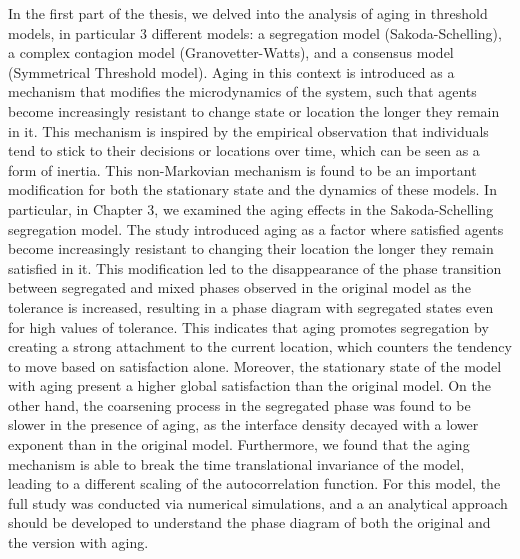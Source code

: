In the first part of the thesis, we delved into the analysis of aging in threshold models, in particular 3 different models: a segregation model (Sakoda-Schelling), a complex contagion model (Granovetter-Watts), and a consensus model (Symmetrical Threshold model). Aging in this context is introduced as a mechanism that modifies the microdynamics of the system, such that agents become increasingly resistant to change state or location the longer they remain in it. This mechanism is inspired by the empirical observation that individuals tend to stick to their decisions or locations over time, which can be seen as a form of inertia. This non-Markovian mechanism is found to be an important modification for both the stationary state and the dynamics of these models. In particular, in Chapter 3, we examined the aging effects in the Sakoda-Schelling segregation model. The study introduced aging as a factor where satisfied agents become increasingly resistant to changing their location the longer they remain satisfied in it. This modification led to the disappearance of the phase transition between segregated and mixed phases observed in the original model as the tolerance is increased, resulting in a phase diagram with segregated states even for high values of tolerance. This indicates that aging promotes segregation by creating a strong attachment to the current location, which counters the tendency to move based on satisfaction alone. Moreover, the stationary state of the model with aging present a higher global satisfaction than the original model. On the other hand, the coarsening process in the segregated phase was found to be slower in the presence of aging, as the interface density decayed with a lower exponent than in the original model. Furthermore, we found that the aging mechanism is able to break the time translational invariance of the model, leading to a different scaling of the autocorrelation function. For this model, the full study was conducted via numerical simulations, and a an analytical approach should be developed to understand the phase diagram of both the original and the version with aging.

